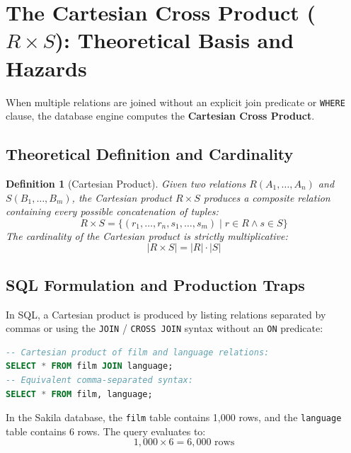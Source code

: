 \documentclass[10pt,twocolumn,letterpaper]{article}
\newtheorem{definition}[theorem]{Definition}
\begin{document}
\section{The Cartesian Cross Product ($R \times S$): Theoretical Basis and Hazards}
\label{sec:cartesian}

When multiple relations are joined without an explicit join predicate or \texttt{WHERE} clause, the database engine computes the \textbf{Cartesian Cross Product}.

\subsection{Theoretical Definition and Cardinality}
\begin{definition}[Cartesian Product]
Given two relations $R(A_1, \dots, A_n)$ and $S(B_1, \dots, B_m)$, the Cartesian product $R \times S$ produces a composite relation containing every possible concatenation of tuples:
\begin{equation}
R \times S = \{ (r_1, \dots, r_n, s_1, \dots, s_m) \mid r \in R \land s \in S \}
\end{equation}
The cardinality of the Cartesian product is strictly multiplicative:
\begin{equation}
|R \times S| = |R| \cdot |S|
\end{equation}
\end{definition}

\subsection{SQL Formulation and Production Traps}
In SQL, a Cartesian product is produced by listing relations separated by commas or using the \texttt{JOIN} / \texttt{CROSS JOIN} syntax without an \texttt{ON} predicate:
\begin{lstlisting}[language=SQL]
-- Cartesian product of film and language relations:
SELECT * FROM film JOIN language;
-- Equivalent comma-separated syntax:
SELECT * FROM film, language;
\end{lstlisting}

In the Sakila database, the \texttt{film} table contains 1,000 rows, and the \texttt{language} table contains 6 rows. The query evaluates to:
\begin{equation*}
1,000 \times 6 = 6,000 \text{ rows}
\end{equation*}
\end{document}
